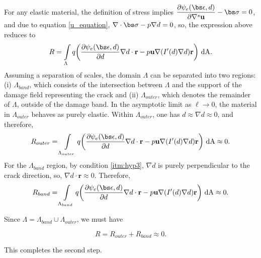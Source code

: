 \noindent For any elastic material, the definition of stress implies $\dfrac{\partial \psi_e(\bs\epsilon, d)}{\partial\nabla^s\textbf{u}}-\bs\sigma = 0$, and due to equation \eqref{u_equation}, $\nabla \cdot \bs\sigma - p \nabla d = 0$, so, the expression above reduces to
\begin{equation}
    R = \int\limits_{\Lambda} q\biggl(\dfrac{\partial \psi_e(\bs\epsilon, d)}{\partial d}\nabla d\cdot \textbf{r} 
    - p\textbf{u}\nabla(I'(d)\nabla d)\textbf{r} \biggr)\ \text{dA}.
\end{equation}
Assuming a separation of scales, the domain $\Lambda$ can be separated into two regions: (i) $\Lambda_{band}$, which consists of the intersection between $\Lambda$ and the support of the damage field representing the crack and (ii) $\Lambda_{outer}$, which denotes the remainder of $\Lambda$, outside of the damage band.  In the asymptotic limit as $\ell\rightarrow 0$, the material in $\Lambda_{outer}$ behaves as purely elastic. Within $\Lambda_{outer}$, one has $d \approx \nabla d \approx 0$, and therefore,  
\begin{equation}
    R_{outer}  = \int\limits_{\Lambda_{outer}} q\biggl(\dfrac{\partial \psi_e(\bs\epsilon, d)}{\partial d}\nabla d\cdot \textbf{r} - p\textbf{u}\nabla(I'(d)\nabla d)\textbf{r} \biggr)\ \text{dA} \approx 0.
\end{equation}
 For the $\Lambda_{band}$ region, by condition \ref{itm:hyp3}, $\nabla d$ is purely perpendicular to the crack direction, so, $\nabla d \cdot \textbf{r} \approx 0$. Therefore,
\begin{equation}
    R_{band} = \int\limits_{\Lambda_{band}} q\biggl(\dfrac{\partial \psi_e(\bs\epsilon, d)}{\partial d}\nabla d\cdot \textbf{r} 
    - p\textbf{u}\nabla(I'(d)\nabla d)\textbf{r} \biggr)\ \text{dA} \approx 0.
\end{equation}


\noindent Since $\Lambda = \Lambda_{band} \cup \Lambda_{outer}$, we must have 

\begin{equation}\label{step2}
    R = R_{outer}+R_{band} \approx 0.
\end{equation}

\noindent This completes the second step. 


